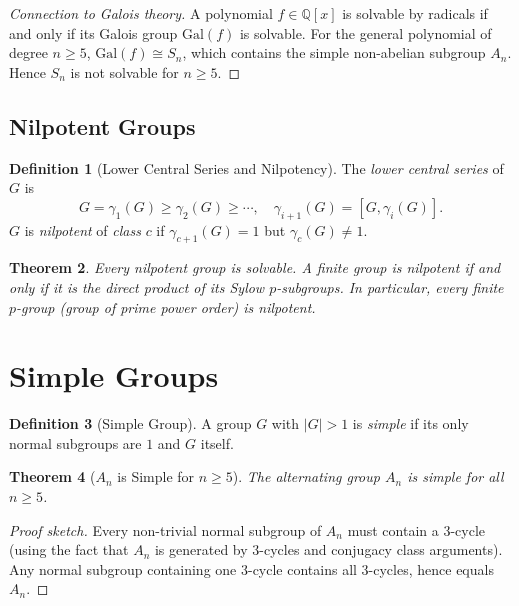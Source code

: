 \documentclass[12pt,a4paper]{amsart}
\newtheorem{theorem}{Theorem}[section]
\theoremstyle{definition}
\newtheorem{definition}[theorem]{Definition}
\begin{document}
\begin{proof}[Connection to Galois theory]
A polynomial $f \in \mathbb{Q}[x]$ is solvable by radicals if and only if its Galois
group $\mathrm{Gal}(f)$ is solvable. For the general polynomial of degree $n \geq 5$,
$\mathrm{Gal}(f) \cong S_n$, which contains the simple non-abelian subgroup $A_n$.
Hence $S_n$ is not solvable for $n \geq 5$.
\end{proof}

\subsection{Nilpotent Groups}

\begin{definition}[Lower Central Series and Nilpotency]
The \emph{lower central series} of $G$ is
\[
  G = \gamma_1(G) \geq \gamma_2(G) \geq \cdots,
  \quad \gamma_{i+1}(G) = [G, \gamma_i(G)].
\]
$G$ is \emph{nilpotent} of \emph{class} $c$ if $\gamma_{c+1}(G) = 1$ but
$\gamma_c(G) \neq 1$.
\end{definition}

\begin{theorem}
Every nilpotent group is solvable. A finite group is nilpotent if and only if it is
the direct product of its Sylow $p$-subgroups. In particular, every finite $p$-group
(group of prime power order) is nilpotent.
\end{theorem}

\section{Simple Groups}
\label{sec:simple}

\begin{definition}[Simple Group]
A group $G$ with $|G| > 1$ is \emph{simple} if its only normal subgroups are $1$ and
$G$ itself.
\end{definition}

\begin{theorem}[$A_n$ is Simple for $n \geq 5$]
\label{thm:an_simple}
The alternating group $A_n$ is simple for all $n \geq 5$.
\end{theorem}

\begin{proof}[Proof sketch]
Every non-trivial normal subgroup of $A_n$ must contain a $3$-cycle (using the fact
that $A_n$ is generated by $3$-cycles and conjugacy class arguments). Any normal
subgroup containing one $3$-cycle contains all $3$-cycles, hence equals $A_n$.
\end{proof}
\end{document}
